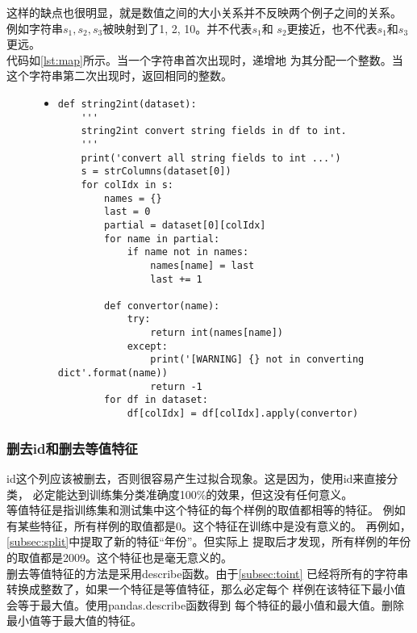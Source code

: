 \documentclass[a4paper]{article}
\begin{document}
这样的缺点也很明显，就是数值之间的大小关系并不反映两个例子之间的关系。
例如字符串$s_1, s_2, s_3$被映射到了1, 2, 10。并不代表$s_1$和
$s_2$更接近，也不代表$s_1$和$s_3$更远。\\

代码如\autoref{lst:map}所示。当一个字符串首次出现时，递增地
为其分配一个整数。当这个字符串第二次出现时，返回相同的整数。

\begin{figure}[!hbt]
\begin{itemize}
\item[] \begin{lstlisting}[style=mypython, label=lst:map, caption=字符串转整数的代码]
def string2int(dataset):
    '''
    string2int convert string fields in df to int.
    '''
    print('convert all string fields to int ...')
    s = strColumns(dataset[0])
    for colIdx in s:
        names = {}
        last = 0
        partial = dataset[0][colIdx]
        for name in partial:
            if name not in names:
                names[name] = last
                last += 1

        def convertor(name):
            try:
                return int(names[name])
            except:
                print('[WARNING] {} not in converting dict'.format(name))
                return -1
        for df in dataset:
            df[colIdx] = df[colIdx].apply(convertor)
\end{lstlisting}
\end{itemize}
\end{figure}

\subsubsection{删去id和删去等值特征}
id这个列应该被删去，否则很容易产生过拟合现象。这是因为，使用id来直接分类，
必定能达到训练集分类准确度100\%的效果，但这没有任何意义。\\

等值特征是指训练集和测试集中这个特征的每个样例的取值都相等的特征。
例如有某些特征，所有样例的取值都是0。这个特征在训练中是没有意义的。
再例如，\autoref{subsec:split}中提取了新的特征``年份''。但实际上
提取后才发现，所有样例的年份的取值都是2009。这个特征也是毫无意义的。\\

删去等值特征的方法是采用describe函数。由于\autoref{subsec:toint}
已经将所有的字符串转换成整数了，如果一个特征是等值特征，那么必定每个
样例在该特征下最小值会等于最大值。使用pandas.describe函数得到
每个特征的最小值和最大值。删除最小值等于最大值的特征。\\
\end{document}
